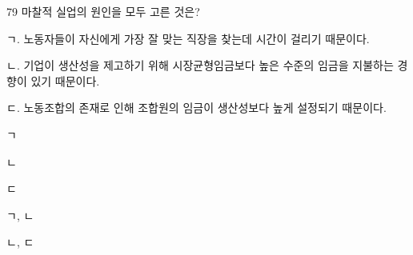\begin{question}{79}
마찰적 실업의 원인을 모두 고른 것은?
\begin{framedtext}
ㄱ. 노동자들이 자신에게 가장 잘 맞는 직장을 찾는데 시간이 걸리기 때문이다. \par
ㄴ. 기업이 생산성을 제고하기 위해 시장균형임금보다 높은 수준의 임금을 지불하는 경향이 있기 때문이다. \par
ㄷ. 노동조합의 존재로 인해 조합원의 임금이 생산성보다 높게 설정되기 때문이다.
\end{framedtext}
\begin{choices}
  \item ㄱ
  \item ㄴ
  \item ㄷ
  \item ㄱ, ㄴ
  \item ㄴ, ㄷ
\end{choices}
\end{question}
